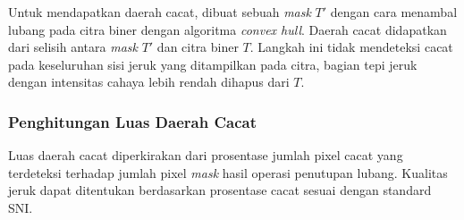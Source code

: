\documentclass[laporan.tex]{subfiles}
\begin{document}
Untuk mendapatkan daerah cacat, dibuat sebuah \emph{mask} $T'$ dengan cara menambal lubang pada citra biner dengan algoritma \emph{convex hull}. Daerah cacat didapatkan dari selisih antara \emph{mask} $T'$ dan citra biner $T$. Langkah ini tidak mendeteksi cacat pada keseluruhan sisi jeruk yang ditampilkan pada citra, bagian tepi jeruk dengan intensitas cahaya lebih rendah dihapus dari $T$.

\subsubsection{Penghitungan Luas Daerah Cacat}

Luas daerah cacat diperkirakan dari prosentase jumlah pixel cacat yang terdeteksi terhadap jumlah pixel \emph{mask} hasil operasi penutupan lubang. Kualitas jeruk dapat ditentukan berdasarkan prosentase cacat sesuai dengan standard SNI.
\end{document}
